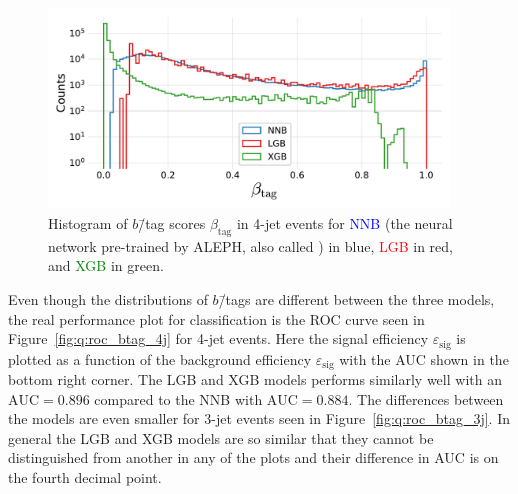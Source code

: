 \begin{figure}[h!]
  \vspace{-0.3cm}
  \centerfloat
  \includegraphics[width=0.95\textwidth, trim=5 15 10 10, clip]{figures/quarks/y_pred_4_jet_hist-down_sample=1.00-ML_vars=vertex-selection=b-ejet_min=4-n_iter_RS_lgb=99-n_iter_RS_xgb=9-cdot_cut=0.90-version=19.pdf}
  \caption[$b$\=/Tag Scores in 4-Jet Events]
          {Histogram of $b$\=/tag scores $\beta_\mathrm{tag}$ in 4-jet events for \textcolor{blue}{NNB} (the neural network pre-trained by ALEPH, also called ) in blue, \textcolor{red}{LGB} in red, and \textcolor{green}{XGB} in green. 
          } 
  \label{fig:q:btag_scores_4j}
\end{figure}
\vspace{-0.3cm}

Even though the distributions of $b$\=/tags are different between the three models, the real performance plot for classification is the ROC curve seen in Figure~\ref{fig:q:roc_btag_4j} for 4-jet events. Here the signal efficiency $\varepsilon_\mathrm{sig}$ is plotted as a function of the background efficiency $\varepsilon_\mathrm{sig}$ with the AUC shown in the bottom right corner. The LGB and XGB models performs similarly well with an $\mathrm{AUC}=0.896$ compared to the NNB with $\mathrm{AUC}=0.884$. The differences between the models are even smaller for 3-jet events seen in Figure~\ref{fig:q:roc_btag_3j}. In general the LGB and XGB models are so similar that they cannot be distinguished from another in any of the plots and their difference in AUC is on the fourth decimal point. \label{page:q:timings_b_tag}

